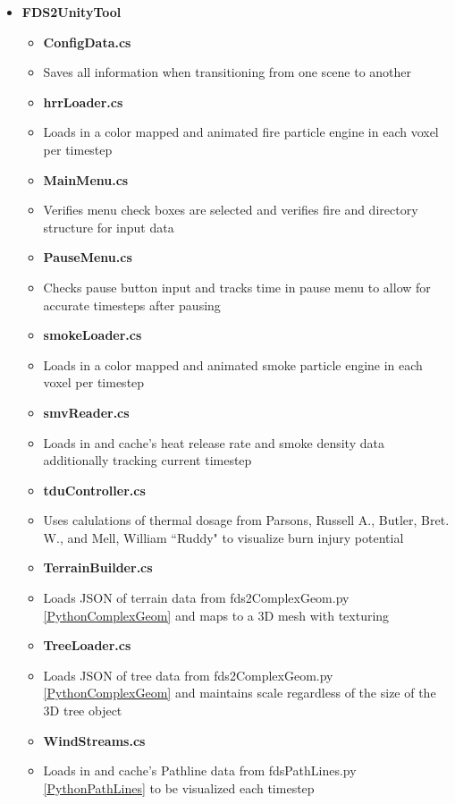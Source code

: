 \begin{itemize}
\item \textbf{FDS2UnityTool}
   \begin{itemize}
        \item \textbf{ConfigData.cs}
        \item[] Saves all information when transitioning from one scene to another 

        \item \textbf{hrrLoader.cs}
        \item[] Loads in a color mapped and animated fire particle engine in each voxel per timestep
        \item \textbf{MainMenu.cs}
        \item[] Verifies menu check boxes are selected and verifies fire and directory structure for input data
        \item \textbf{PauseMenu.cs}
        \item[] Checks pause button input and tracks time in pause menu to allow for accurate timesteps after pausing 
        \item \textbf{smokeLoader.cs}
        \item[] Loads in a color mapped and animated smoke particle engine in each voxel per timestep
        \item \textbf{smvReader.cs}
        \item[] Loads in and cache's heat release rate and smoke density data additionally tracking current timestep
        
        \item \textbf{tduController.cs}
        \item[] Uses calulations of thermal dosage from Parsons, Russell A., Butler, Bret. W., and Mell, William “Ruddy" to visualize burn injury potential \cite{Parsons2014}
        \item \textbf{TerrainBuilder.cs}
        \item[] Loads JSON of terrain data from fds2ComplexGeom.py \ref{PythonComplexGeom} and maps to a 3D mesh with texturing
        \item \textbf{TreeLoader.cs}
        \item[] Loads JSON of tree data from  fds2ComplexGeom.py \ref{PythonComplexGeom} and maintains scale regardless of the size of the 3D tree object        
        \item \textbf{WindStreams.cs}
        \item[] Loads in and cache's Pathline data from fdsPathLines.py \ref{PythonPathLines} to be visualized each timestep
        \end{itemize}
\end{itemize}
\pagebreak

